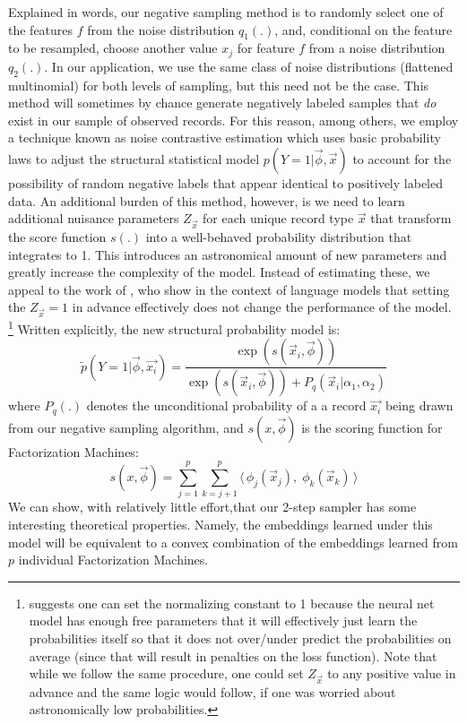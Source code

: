 \documentclass{article} %
\newcommand{\vect}[1]{\vec{#1}}
\renewcommand{\cite}[1]{\citep{#1}}
\begin{document}
Explained in words, our negative sampling method is to randomly select one of the features $f$ from the noise distribution $q_1(.)$, and, conditional on the feature to be resampled, choose another value $x_j$ for feature $f$ from a noise distribution $q_2(.)$.
In our application, we use the same class of noise distributions (flattened multinomial) for both levels of sampling, but this need not be the case.
This method will sometimes by chance generate negatively labeled samples that \textit{do} exist in our sample of observed records.
For this reason, among others, we employ a technique known as noise contrastive estimation \cite{nce} which uses basic probability laws to adjust the structural statistical model $p(Y=1|\vec{\phi},\vec{x})$ to account for the possibility of random negative labels that appear identical to positively labeled data.
An additional burden of this method, however, is we need to learn additional nuisance parameters $Z_{\vec{x}}$ for each unique record type $\vec{x}$ that transform the score function $s(.)$ into a well-behaved probability distribution that integrates to 1.
This introduces an astronomical amount of new parameters and greatly increase the complexity of the model.
Instead of estimating these, we appeal to the work of \cite{fastnnlang},
who show in the context of language models that setting the $Z_{\vec{x}}=1$ in advance effectively does not change the performance of the model.
\footnote{\cite{fastnnlang} suggests one can set the normalizing constant to 1 because the neural net model has enough free parameters that it will effectively just learn the probabilities itself so that it does not over/under predict the probabilities on average (since that will result in penalties on the loss function). Note that while we follow the same procedure, one could set $Z_{\vec{x}}$ to any positive value in advance and the same logic would follow, if one was worried about astronomically low probabilities.}
Written explicitly, the new structural probability model is:
\[\tilde p(Y=1|\vec{\phi},\vec{x_i}) = \frac{\exp(s(\vec{x}_i,\vec{\phi}))}{\exp(s(\vec{x}_i,\vec{\phi})) + P_{q}(\vec{x}_i| \alpha_1,\alpha_2)}\]
where $P_q(.)$ denotes the unconditional probability of a a record $\vec{x_i}$ being drawn from our negative sampling algorithm, and  $s(x,\vec{\phi})$ is the scoring function for Factorization Machines:
\[
s(x,\vec{\phi}) =
\sum_{j =1}^p \sum_{k=j+1}^{p}   \bigl\langle \,  \phi_j( \vect{x}_{j}), \; \phi_k( \vect{x}_{k}) \, \bigr\rangle
\]
We can show, with relatively little effort,that our 2-step sampler has some interesting theoretical properties. Namely, the embeddings learned under this model will be equivalent to a convex combination of the embeddings learned from $p$ individual Factorization Machines.
\end{document}
